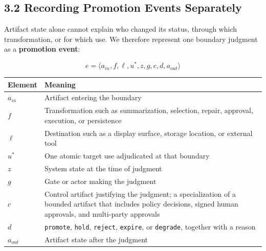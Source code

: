 \subsection{3.2 Recording Promotion Events Separately}\label{recording-promotion-events-separately}

Artifact state alone cannot explain who changed its status, through which transformation, or for which use. We therefore represent one boundary judgment as a \textbf{promotion event}:

\[
e = \langle a_{in}, f, \ell, u^{\ast}, z, g, c, d, a_{out} \rangle
\]

{\def\LTcaptype{none} %
\begin{longtable}[]{@{}
  >{\raggedright\arraybackslash}p{}
  >{\raggedright\arraybackslash}p{}@{}}
\toprule\noalign{}
\begin{minipage}[b]{\linewidth}\raggedright
Element
\end{minipage} & \begin{minipage}[b]{\linewidth}\raggedright
Meaning
\end{minipage} \\
\midrule\noalign{}
\endhead
\bottomrule\noalign{}
\endlastfoot
\(a_{in}\) & Artifact entering the boundary \\
\(f\) & Transformation such as summarization, selection, repair, approval, execution, or persistence \\
\(\ell\) & Destination such as a display surface, storage location, or external tool \\
\(u^{\ast}\) & One atomic target use adjudicated at that boundary \\
\(z\) & System state at the time of judgment \\
\(g\) & Gate or actor making the judgment \\
\(c\) & Control artifact justifying the judgment; a specialization of a bounded artifact that includes policy decisions, signed human approvals, and multi-party approvals \\
\(d\) & \passthrough{\lstinline!promote!}, \passthrough{\lstinline!hold!}, \passthrough{\lstinline!reject!}, \passthrough{\lstinline!expire!}, or \passthrough{\lstinline!degrade!}, together with a reason \\
\(a_{out}\) & Artifact state after the judgment \\
\end{longtable}
}

